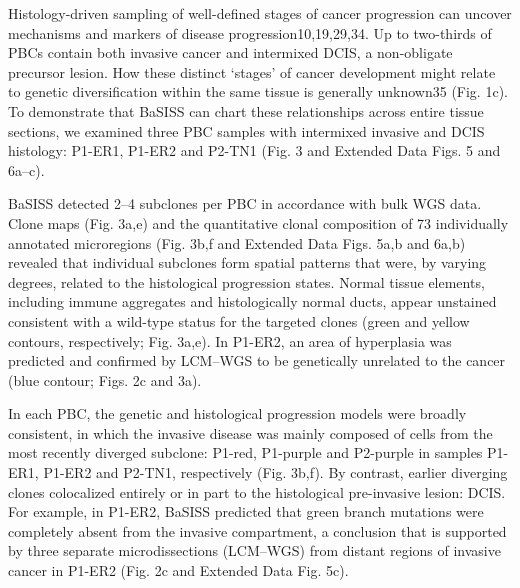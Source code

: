 Histology-driven sampling of well-defined stages of cancer progression can uncover mechanisms and markers of disease progression10,19,29,34. Up to two-thirds of PBCs contain both invasive cancer and intermixed DCIS, a non-obligate precursor lesion. How these distinct ‘stages’ of cancer development might relate to genetic diversification within the same tissue is generally unknown35 (Fig. 1c). To demonstrate that BaSISS can chart these relationships across entire tissue sections, we examined three PBC samples with intermixed invasive and DCIS histology: P1-ER1, P1-ER2 and P2-TN1 (Fig. 3 and Extended Data Figs. 5 and 6a–c).

BaSISS detected 2–4 subclones per PBC in accordance with bulk WGS data. Clone maps (Fig. 3a,e) and the quantitative clonal composition of 73 individually annotated microregions (Fig. 3b,f and Extended Data Figs. 5a,b and 6a,b) revealed that individual subclones form spatial patterns that were, by varying degrees, related to the histological progression states. Normal tissue elements, including immune aggregates and histologically normal ducts, appear unstained consistent with a wild-type status for the targeted clones (green and yellow contours, respectively; Fig. 3a,e). In P1-ER2, an area of hyperplasia was predicted and confirmed by LCM–WGS to be genetically unrelated to the cancer (blue contour; Figs. 2c and 3a).

In each PBC, the genetic and histological progression models were broadly consistent, in which the invasive disease was mainly composed of cells from the most recently diverged subclone: P1-red, P1-purple and P2-purple in samples P1-ER1, P1-ER2 and P2-TN1, respectively (Fig. 3b,f). By contrast, earlier diverging clones colocalized entirely or in part to the histological pre-invasive lesion: DCIS. For example, in P1-ER2, BaSISS predicted that green branch mutations were completely absent from the invasive compartment, a conclusion that is supported by three separate microdissections (LCM–WGS) from distant regions of invasive cancer in P1-ER2 (Fig. 2c and Extended Data Fig. 5c).

